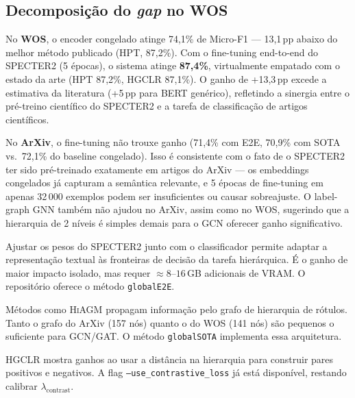 \documentclass[11pt,a4paper,twoside]{article}
\begin{document}
\subsection{Decomposição do \textit{gap} no WOS}

No \textbf{WOS}, o encoder congelado atinge 74,1\% de Micro-F1 --- 13,1\,pp abaixo do
melhor método publicado (HPT, 87,2\%). Com o fine-tuning end-to-end do SPECTER2
(5 épocas), o sistema atinge \textbf{87,4\%}, virtualmente empatado com o estado da
arte (HPT 87,2\%, HGCLR 87,1\%). O ganho de +13,3\,pp excede a estimativa da
literatura (+5\,pp para BERT genérico), refletindo a sinergia entre o pré-treino
científico do SPECTER2 e a tarefa de classificação de artigos científicos.

No \textbf{ArXiv}, o fine-tuning não trouxe ganho (71,4\% com E2E, 70,9\% com SOTA
vs.\ 72,1\% do baseline congelado). Isso é consistente com o fato de o SPECTER2 ter
sido pré-treinado exatamente em artigos do ArXiv --- os embeddings congelados já
capturam a semântica relevante, e 5 épocas de fine-tuning em apenas 32\,000 exemplos
podem ser insuficientes ou causar sobreajuste. O label-graph GNN também não ajudou
no ArXiv, assim como no WOS, sugerindo que a hierarquia de 2 níveis é simples demais
para o GCN oferecer ganho significativo.

\begin{description}[leftmargin=*, itemsep=4pt, font=\bfseries]

  \item[Fine-tuning end-to-end (est.\ +5\,pp).]
  Ajustar os pesos do \textsc{SPECTER2} junto com o classificador permite
  adaptar a representação textual às fronteiras de decisão da tarefa hierárquica.
  É o ganho de maior impacto isolado, mas requer $\approx 8$--$16$\,GB adicionais
  de VRAM. O repositório oferece o método \texttt{globalE2E}.

  \item[Label-graph GNN (est.\ +4--6\,pp).]
  Métodos como \textsc{HiAGM} \cite{zhou2020hiagm} propagam informação pelo
  grafo de hierarquia de rótulos. Tanto o grafo do ArXiv (157 nós) quanto o do
  WOS (141 nós) são pequenos o suficiente para GCN/GAT. O método
  \texttt{globalSOTA} implementa essa arquitetura.

  \item[Perda contrastiva hierárquica (est.\ +2--4\,pp).]
  \textsc{HGCLR} \cite{wang2022hgclr} mostra ganhos ao usar a distância na
  hierarquia para construir pares positivos e negativos. A flag
  \texttt{--use\_contrastive\_loss} já está disponível, restando calibrar
  $\lambda_{\text{contrast}}$.

\end{description}
\end{document}
